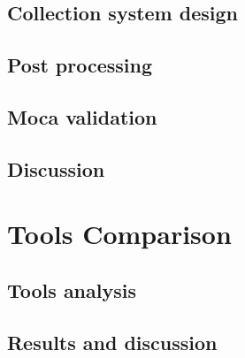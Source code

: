 \subsection{Collection system design}

\subsection{Post processing}

\subsection{Moca validation}

\subsection{Discussion}

\section{Tools Comparison}
\label{sec:Tools-Comp}

\subsection{Tools analysis}

\subsection{Results and discussion}


